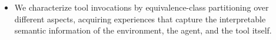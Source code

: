 \documentclass[11pt]{article}
\begin{document}
\begin{itemize}%
    \item  
    We characterize tool invocations by equivalence-class partitioning over different aspects, acquiring experiences that capture the interpretable semantic information of the environment, the agent, and the tool itself.
    

\end{itemize}
\end{document}
